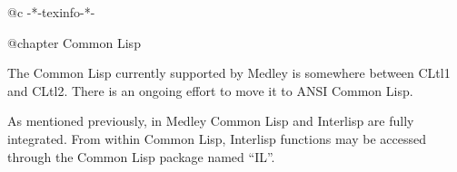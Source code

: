 @c -*-texinfo-*-

@chapter Common Lisp

The Common Lisp currently supported by Medley is somewhere between
CLtl1 and CLtl2.  There is an ongoing effort to move it to ANSI
Common Lisp.

As mentioned previously, in Medley Common Lisp and Interlisp are fully
integrated.  From within Common Lisp, Interlisp functions may be
accessed through the Common Lisp package named ``IL''.

